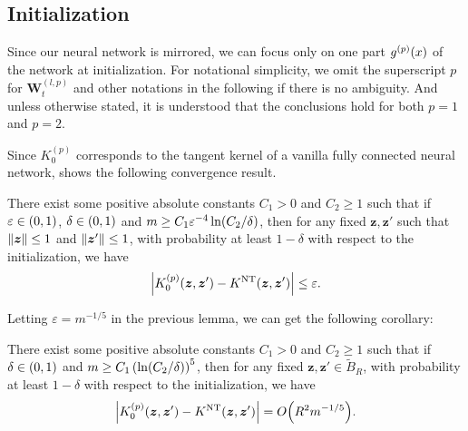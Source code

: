 \subsection{Initialization}\label{subsec:Init}
Since our neural network is mirrored, we can focus only on one part $g^{(p)}(x)$ of the network at initialization.
For notational simplicity, we omit the superscript $p$ for $\bm{W}^{(l,p)}_t$ and other notations in the following if there is no ambiguity.
And unless otherwise stated, it is understood that the conclusions hold for both $p = 1$ and $p = 2$.

Since $K^{(p)}_0$ corresponds to the tangent kernel of a vanilla fully connected neural network,
\citet[Theorem 3.1]{arora2019_ExactComputation} shows the following convergence result.



\begin{lemma}
  There exist some positive absolute constants $C_1>0$ and $C_2\geq 1$ such that if $\varepsilon\in\left(0,1\right)$, $\delta\in\left(0,1\right)$ and $m\geq C_1\varepsilon^{-4}\ln\xkm{C_2/\delta}$, then for any fixed $\bm{z}, \bm{z}'$ such that $\norm{\bm{z}} \leq 1$ and $\norm{\bm{z}'}\leq 1$, with probability at least $1-\delta$ with respect to the initialization, we have
  \[\abs{K^{(p)}_0\xkm{\bm{z},\bm{z}'}-\NTK\xkm{\bm{z},\bm{z}'}}\leq\varepsilon.\]

\end{lemma}

Letting $\varepsilon=m^{-1/5}$ in the previous lemma, we can get the following corollary:
\begin{corollary}
  \label{cor:Init_Kt_NTK}

  There exist some positive absolute constants $C_1>0$ and $C_2\geq 1$ such that if $\delta\in\left(0,1\right)$ and $m\geq C_1\xk{\ln\xkm{C_2/\delta}}^5$, 
  then for any fixed $\bm{z},\bm{z}'\in \tilde{B}_R$, with probability at least $1-\delta$ with respect to the initialization, we have
  \[\abs{K^{(p)}_0\xkm{\bm{z},\bm{z}'}-\NTK\xkm{\bm{z},\bm{z}'}}=O\xkm{ R^2 m^{-1/5}}.\]

\end{corollary}

